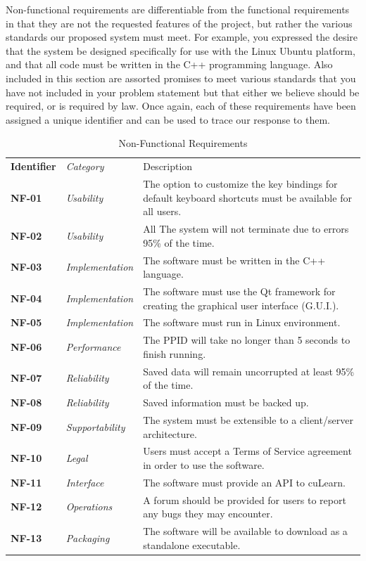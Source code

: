 \documentclass[12pt,letterpaper]{article}
\begin{document}
Non-functional requirements are differentiable from the functional requirements in that they are not the requested features of the project, but
rather the various standards our proposed system must meet. For example, you expressed the desire that the system be designed specifically 
for use with the Linux Ubuntu platform, and that all code must be written in the C++ programming language. Also included in this section are
assorted promises to meet various standards that you have not included in your problem statement but that either we believe should be required, 
or is required by law. Once again, each of these requirements have been assigned a unique identifier and can be used to trace our response to them.

\begin{table}[H]
	\caption{Non-Functional Requirements}
	\vspace{1em}
	\begin{tabu} to 
	    \tableheader{}Identifier & Category & Description\\
		NF-01 & Usability & The option to customize the key bindings for default keyboard shortcuts must be available for all users.\\
		NF-02 & Usability & All The system will not terminate due to errors 95\% of the time.\\
		NF-03 & Implementation & The software must be written in the C++ language. \\
		NF-04 & Implementation & The software must use the Qt framework for creating the graphical user interface (G.U.I.). \\
		NF-05 & Implementation & The software must run in Linux environment. \\
		NF-06 & Performance & The PPID will take no longer than 5 seconds to finish running. \\
		NF-07 & Reliability & Saved data will remain uncorrupted at least 95\% of the time. \\
		NF-08 & Reliability & Saved information must be backed up. \\
		NF-09 & Supportability & The system must be extensible to a client/server architecture. \\
		NF-10 & Legal & Users must accept a Terms of Service agreement in order to use the software.\\
		NF-11 & Interface & The software must provide an API to cuLearn.\\
		NF-12 & Operations & A forum should be provided for users to report any bugs they may encounter. \\
		NF-13 & Packaging & The software will be available to download as a standalone executable. \\
	\end{tabu}
\end{table}
\end{document}
